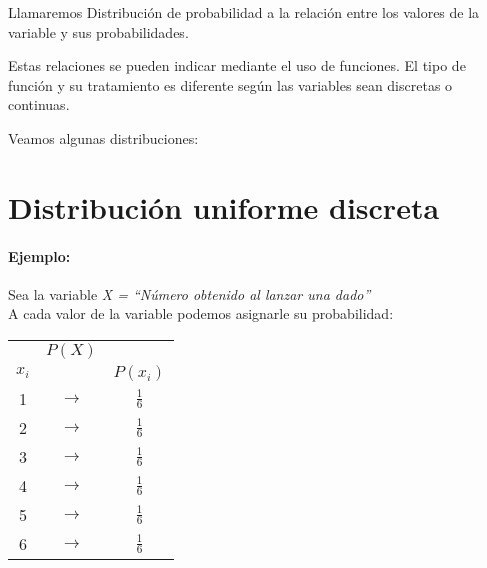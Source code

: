Llamaremos Distribución de probabilidad a la relación entre los valores de la variable y sus probabilidades.

Estas relaciones se pueden indicar mediante el uso de funciones. El tipo de función y su tratamiento es diferente según las variables sean discretas o continuas.

Veamos algunas distribuciones:


\section{Distribución uniforme discreta}

\paragraph{Ejemplo: } Sea la variable \emph{X = “Número obtenido al lanzar una dado”}\\
A cada valor de la variable podemos asignarle su probabilidad:


\begin{center}
\begin{tabular}{ccc}
 & $P(X)$ &  \\
$x_i$ &  &  $P(x_i)$\\ \hline 
1 & $\rightarrow$ & $\tfrac{1}{6}$ \\ 
2 & $\rightarrow$ & $\tfrac{1}{6}$ \\ 
3 & $\rightarrow$ & $\tfrac{1}{6}$ \\ 
4 & $\rightarrow$ & $\tfrac{1}{6}$ \\ 
5 & $\rightarrow$ & $\tfrac{1}{6}$ \\ 
6 & $\rightarrow$ & $\tfrac{1}{6}$ \\ 
\end{tabular} 
\end{center}

